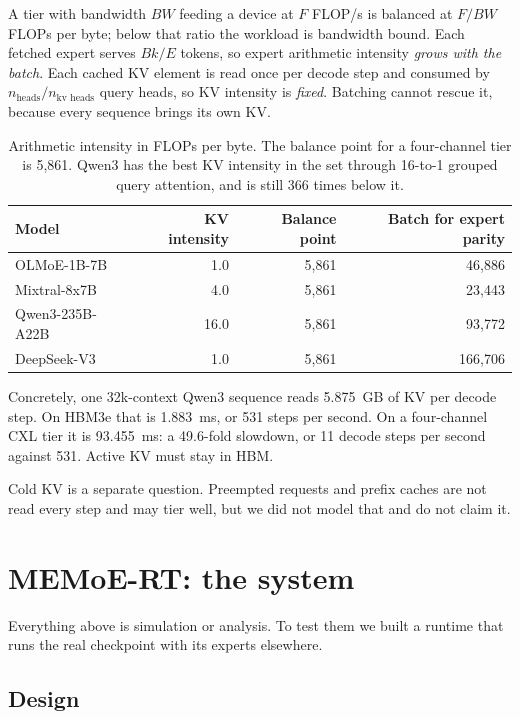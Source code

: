 \documentclass[10pt,a4paper]{article}
\begin{document}
A tier with bandwidth $BW$ feeding a device at $F$ FLOP/s is balanced at $F/BW$
FLOPs per byte; below that ratio the workload is bandwidth bound. Each fetched
expert serves $Bk/E$ tokens, so expert arithmetic intensity \emph{grows with the
batch}. Each cached KV element is read once per decode step and consumed by
$n_{\text{heads}}/n_{\text{kv heads}}$ query heads, so KV intensity is
\emph{fixed}. Batching cannot rescue it, because every sequence brings its own KV.

\begin{table}[htbp]
\centering\small
\caption{Arithmetic intensity in FLOPs per byte. The balance point for a
four-channel tier is 5{,}861. Qwen3 has the best KV intensity in the set through
16-to-1 grouped query attention, and is still 366 times below it.}
\label{tab:kv}
\begin{tabular}{lrrr}
\toprule
Model & KV intensity & Balance point & Batch for expert parity \\
\midrule
OLMoE-1B-7B     & 1.0  & 5{,}861 & 46{,}886 \\
Mixtral-8x7B    & 4.0  & 5{,}861 & 23{,}443 \\
Qwen3-235B-A22B & 16.0 & 5{,}861 & 93{,}772 \\
DeepSeek-V3     & 1.0  & 5{,}861 & 166{,}706 \\
\bottomrule
\end{tabular}
\end{table}

Concretely, one 32k-context Qwen3 sequence reads 5.875~GB of KV per decode step.
On HBM3e that is 1.883~ms, or 531 steps per second. On a four-channel CXL tier it
is 93.455~ms: a 49.6-fold slowdown, or 11 decode steps per second against 531.
Active KV must stay in HBM.

Cold KV is a separate question. Preempted requests and prefix caches are not read
every step and may tier well, but we did not model that and do not claim it.

\section{MEMoE-RT: the system}
\label{sec:system}

Everything above is simulation or analysis. To test them we built a runtime
that runs the real checkpoint with its experts elsewhere.

\subsection{Design}
\end{document}

